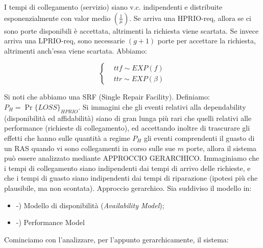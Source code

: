I tempi di collegamento (servizio) siano v.c. indipendenti e distribuite esponenzialmente con valor medio $(\frac{1}{\mu})$. Se arriva una HPRIO-req, allora se ci sono porte disponibili è accettata, altrimenti la richiesta viene scartata. Se invece arriva una LPRIO-req, sono necessarie $(g+1)$ porte per accettare la richiesta, altrimenti anch'essa viene scartata. Abbiamo:

\[	
	\left\{
	\begin{aligned}
	&ttf\sim EXP(f)\\
	&ttr\sim EXP(\beta)
	\end{aligned}
	\right.
\]

Si noti che abbiamo una SRF (Single Repair Facility). Definiamo: $P_H=\Pr\{LOSS\}_{HPRIO}$. Si immagini che gli eventi relativi alla dependability (disponibilità ed affidabilità) siano di gran lunga più rari che quelli relativi alle performance (richieste di collegamento), ed accettando inoltre di trascurare gli effetti che hanno sulle quantità a regime $P_H$ gli eventi comprendenti il guasto di un RAS quando vi sono collegamenti in corso sulle sue $m$ porte, allora il sistema può essere analizzato mediante APPROCCIO GERARCHICO. Immaginiamo che i tempi di collegamento siano indipendenti dai tempi di arrivo delle richieste, e che i tempi di guasto siano indipendenti dai tempi di riparazione (ipotesi più che plausibile, ma non scontata). Approccio gerarchico. Sia suddiviso il modello in:

\begin{itemize}
\item{-)} Modello di disponibilità (\textit{Availability Model});
\item{-)} Performance Model
\end{itemize}

Cominciamo con l'analizzare, per l'appunto gerarchicamente, il sistema:

